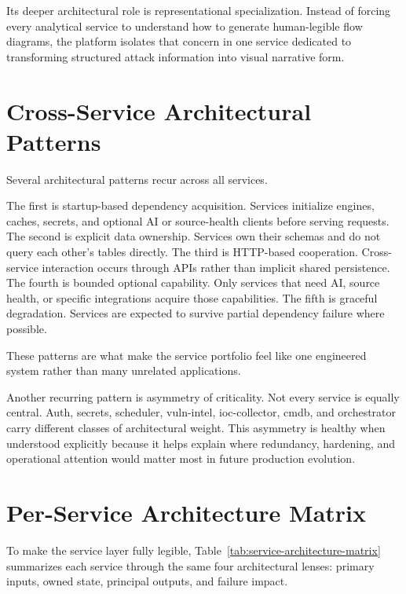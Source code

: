 Its deeper architectural role is representational specialization. Instead of forcing every analytical service to understand how to generate human-legible flow diagrams, the platform isolates that concern in one service dedicated to transforming structured attack information into visual narrative form.

\section{Cross-Service Architectural Patterns}
Several architectural patterns recur across all services.

The first is startup-based dependency acquisition. Services initialize engines, caches, secrets, and optional AI or source-health clients before serving requests. The second is explicit data ownership. Services own their schemas and do not query each other's tables directly. The third is HTTP-based cooperation. Cross-service interaction occurs through APIs rather than implicit shared persistence. The fourth is bounded optional capability. Only services that need AI, source health, or specific integrations acquire those capabilities. The fifth is graceful degradation. Services are expected to survive partial dependency failure where possible.

These patterns are what make the service portfolio feel like one engineered system rather than many unrelated applications.

Another recurring pattern is asymmetry of criticality. Not every service is equally central. Auth, secrets, scheduler, vuln-intel, ioc-collector, cmdb, and orchestrator carry different classes of architectural weight. This asymmetry is healthy when understood explicitly because it helps explain where redundancy, hardening, and operational attention would matter most in future production evolution.

\section{Per-Service Architecture Matrix}
To make the service layer fully legible, Table~\ref{tab:service-architecture-matrix} summarizes each service through the same four architectural lenses: primary inputs, owned state, principal outputs, and failure impact.

